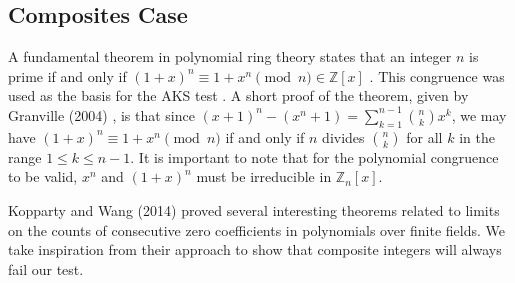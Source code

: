 \documentclass{article}
\theoremstyle{plain}
\theoremstyle{definition}
\newcommand{\Z}{\mathbb{Z}}
\begin{document}
\subsection{Composites Case}

A fundamental theorem in polynomial ring theory states that an integer $n$ is prime if and only if $(1 + x)^n \equiv 1 + x^n \pmod{n} \in \Z[x]$ \cite{granville2004primes}. This congruence was used as the basis for the AKS test \cite{aks2002}. A short proof of the theorem, given by Granville (2004) \cite{granville2004primes}, is that since $(x + 1)^n - (x^n + 1) = \sum_{k=1}^{n-1} \binom{n}{k} x^k$, we may have $(1 + x)^n \equiv 1 + x^n \pmod{n}$ if and only if $n$ divides $\binom{n}{k}$ for all $k$ in the range $1 \leq k \leq n-1$. It is important to note that for the polynomial congruence to be valid, $x^n$ and $(1+x)^n$ must be irreducible in $\Z_n[x]$.

Kopparty and Wang (2014) \cite{koppartywang2014roots} proved several interesting theorems related to limits on the counts of consecutive zero coefficients in polynomials over finite fields. We take inspiration from their approach to show that composite integers will always fail our test.
\end{document}
